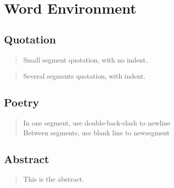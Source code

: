 \section{Word Environment}
\subsection{Quotation}
\begin{quote}
    Small segment quotation, with no indent.
\end{quote}

\begin{quotation}
    Several segments quotation, with indent.
\end{quotation}

\subsection{Poetry}
\begin{verse}
    In one segment, use double-back-slash to newline \\
    Between segments, use blank line to newsegment
\end{verse}

\subsection{Abstract}
\begin{abstract}
    This is the abstract.
\end{abstract}